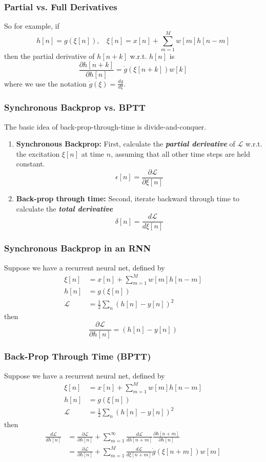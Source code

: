 \documentclass{beamer}
\begin{document}
\begin{frame}
  \frametitle{Partial vs. Full Derivatives}

  So for example, if
  \[
  h[n] =g(\xi[n]),~~~~\xi[n]=x[n]+\sum_{m=1}^{M}w[m]h[n-m]
  \]
  then the partial derivative of $h[n+k]$ w.r.t. $h[n]$ is 
  \[
  \frac{\partial h[n+k]}{\partial h[n]}= \dot{g}(\xi[n+k]) w[k] 
  \]
  where we use the notation $\dot{g}(\xi)=\frac{dg}{d\xi}$.
\end{frame}

\begin{frame}
  \frametitle{Synchronous Backprop vs. BPTT}

  The basic idea of back-prop-through-time is divide-and-conquer.
  \begin{enumerate}
    \item {\bf Synchronous Backprop:} First, calculate the {\bf\em
      partial derivative} of ${\mathcal L}$ w.r.t. the excitation $\xi[n]$ at time
      $n$, assuming that all other time steps are held constant.
      \[
      \epsilon[n] = \frac{\partial {\mathcal L}}{\partial\xi[n]}
      \]
    \item {\bf Back-prop through time:} Second, iterate backward
      through time to calculate the {\bf\em total derivative}
      \[
      \delta[n] = \frac{d{\mathcal L}}{d\xi[n]}
      \]
  \end{enumerate}
\end{frame}

\begin{frame}
  \frametitle{Synchronous Backprop in an RNN}
  Suppose we have a recurrent neural net, defined by
  \begin{align*}
    \xi[n] &= x[n] + \sum_{m=1}^{M}w[m] h[n-m]\\
    h[n] &= g\left(\xi[n]\right)\\
    {\mathcal L} &= \frac{1}{2}\sum_n\left(h[n]-y[n]\right)^2
  \end{align*}
  then
  \[
  \frac{\partial {\mathcal L}}{\partial h[n]} = \left(h[n]-y[n]\right)
  \]
\end{frame}
  
\begin{frame}
  \frametitle{Back-Prop Through Time (BPTT)}
  Suppose we have a recurrent neural net, defined by
  \begin{align*}
    \xi[n] &= x[n] + \sum_{m=1}^{M}w[m] h[n-m]\\
    h[n] &= g\left(\xi[n]\right)\\
    {\mathcal L} &= \frac{1}{2}\sum_n\left(h[n]-y[n]\right)^2
  \end{align*}
  then
  \begin{align*}
    \frac{d{\mathcal L}}{d h[n]}
    &=\frac{\partial {\mathcal L}}{\partial h[n]}+
    \sum_{m=1}^{\infty}\frac{d{\mathcal L}}{d h[n+m]}\frac{\partial h[n+m]}{\partial h[n]}\\
    &=\frac{\partial {\mathcal L}}{\partial h[n]}+
    \sum_{m=1}^{M}\frac{d{\mathcal L}}{d\xi[n+m]}\dot{g}(\xi[n+m]) w[m]
  \end{align*}
\end{frame}
  
\end{document}
